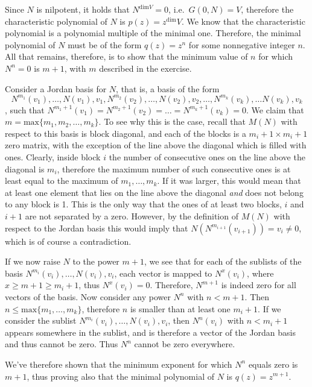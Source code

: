 \begin{solution}

    Since $N$ is nilpotent, it holds that $N^{\text{dim}V} = 0$, i.e.\ $G(0, N) = V$, therefore the characteristic polynomial of $N$ is $p(z)=z^\text{dim} V$. We know that the characteristic polynomial is a polynomial multiple of the minimal one. Therefore, the minimal polynomial of $N$ must be of the form $q(z) =z^n$ for some nonnegative integer $n$. All that remains, therefore, is to show that the minimum value of $n$ for which $N^n = 0$ is $m+1$, with $m$ described in the exercise. 
    
    Consider a Jordan basis for $N$, that is, a basis of the form 
    $$N^{m_1}(v_1), \ldots, N(v_1), v_1, N^{m_2}(v_2), \ldots, N(v_2), v_2, \ldots, N^{m_k}(v_k), \ldots N(v_k), v_k$$ 
    , such that $N^{m_1+1}(v_1) = N^{m_2+1}(v_2) = \ldots = N^{m_k+1}(v_k) = 0$. We claim that $m = \text{max}\{m_1, m_2, \ldots, m_k\}$. To see why this is the case, recall that $M(N)$ with respect to this basis is block diagonal, and each of the blocks is a $m_i+1 \times m_i+1$ zero matrix, with the exception of the line above the diagonal which is filled with ones. Clearly, inside block $i$ the number of consecutive ones on the line above the diagonal is $m_i$, therefore the maximum number of such consecutive ones is at least equal to the maximum of $m_1, \ldots, m_k$. If it was larger, this would mean that at least one element that lies on the line above the diagonal \textit{and} does not belong to any block is 1. This is the only way that the ones of at least two blocks, $i$ and $i+1$ are not separated by a zero. However, by the definition of $M(N)$ with respect to the Jordan basis this would imply that $N(N^{m_{i+1}}(v_{i+1})) = v_i \neq 0$, which is of course a contradiction.

    If we now raise $N$ to the power $m+1$, we see that for each of the sublists of the basis $N^{m_i}(v_i), \ldots, N(v_i), v_i$, each vector is mapped to $N^x(v_i)$, where $x \geq m+1 \geq m_i+1$, thus $N^x(v_i) = 0$. Therefore, $N^{m+1}$ is indeed zero for all vectors of the basis. Now consider any power $N^n$ with $n < m+1$. Then $n \leq \text{max}\{m_1, \ldots, m_k\}$, therefore $n$ is smaller than at least one $m_i + 1$. If we consider the sublist $N^{m_i}(v_i), \ldots, N(v_i), v_i$, then $N^n(v_i)$ with $n < m_i+1$ appears somewhere in the sublist, and is therefore a vector of the Jordan basis and thus cannot be zero. Thus $N^n$ cannot be zero everywhere.

    We've therefore shown that the minimum exponent for which $N^n$ equals zero is $m+1$, thus proving also that the minimal polynomial of $N$ is $q(z) = z^{m+1}$.
\end{solution}

